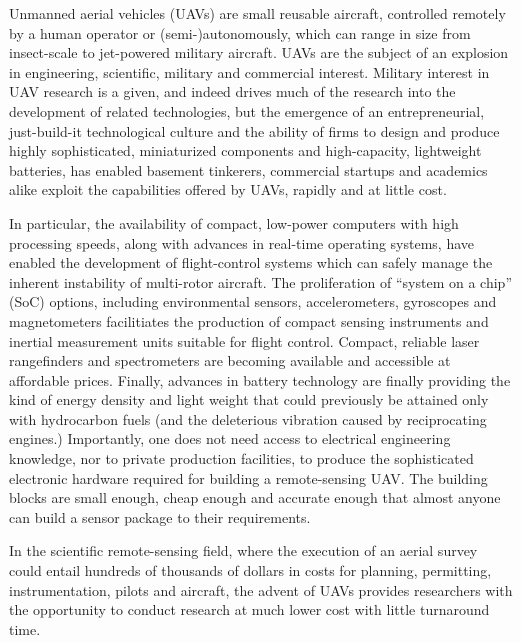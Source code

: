 \label{chapter:introduction}

Unmanned aerial vehicles (UAVs) are small reusable aircraft, controlled remotely by a human operator or (semi-)autonomously, which can range in size from insect-scale \cite{Avadhanula2002,Deng2003} to jet-powered military aircraft. UAVs are the subject of an explosion in engineering, scientific, military and commercial interest. Military interest in UAV research is a given, and indeed drives much of the research into the development of related technologies, but the emergence of an entrepreneurial, just-build-it technological culture and the ability of firms to design and produce highly sophisticated, miniaturized components and high-capacity, lightweight batteries, has enabled basement tinkerers, commercial startups and academics alike exploit the capabilities offered by UAVs, rapidly and at little cost.

In particular, the availability of compact, low-power computers with high processing speeds, along with advances in real-time operating systems, have enabled the development of flight-control systems which can safely manage the inherent instability of multi-rotor aircraft. The proliferation of ``system on a chip'' (SoC) options, including environmental sensors, accelerometers, gyroscopes and magnetometers facilitiates the production of compact sensing instruments and inertial measurement units suitable for flight control. Compact, reliable laser rangefinders and spectrometers are becoming available and accessible at affordable prices. Finally, advances in battery technology are finally providing the kind of energy density and light weight that could previously be attained only with hydrocarbon fuels (and the deleterious vibration caused by reciprocating engines.) Importantly, one does not need access to electrical engineering knowledge, nor to private production facilities, to produce the sophisticated electronic hardware required for building a remote-sensing UAV. The building blocks are small enough, cheap enough and accurate enough that almost anyone can build a sensor package to their requirements.



In the scientific remote-sensing field, where the execution of an aerial survey could entail hundreds of thousands of dollars in costs for planning, permitting, instrumentation, pilots and aircraft, the advent of UAVs provides researchers with the opportunity to conduct research at much lower cost with little turnaround time. 

